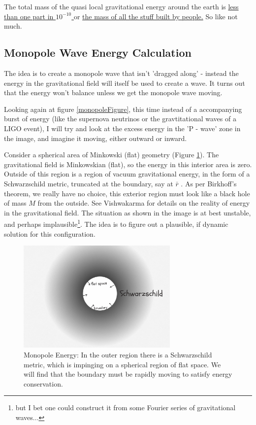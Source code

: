 \documentclass[../rzero]{subfiles}
\begin{document}
The total mass of the quasi local gravitational energy around the earth is  \href{https://www.wolframalpha.com/input?i=%28G*%28mass+of+earth%29%5E2%2F%28c%5E2%2812000km%29%29%29%2F%28mass+of+earth%29}{less than one part in $10^{-10}$ } or \href{https://www.wolframalpha.com/input?i=G*%28mass+of+earth%29%5E2%2F%28c%5E2%2812000km%29%29}{the mass of all the stuff built by people.} So like not much.

\subsection{Monopole Wave Energy Calculation }
The idea is to create a monopole wave that isn't 'dragged along' - instead the energy in the gravitational field will itself be used to create a wave. It turns out that the energy won't balance unless we get the monopole wave moving.

Looking again at figure \ref{monopoleFigure}, this time instead of a accompanying burst of energy (like the supernova neutrinos or the gravtitational waves of a LIGO event), I will try and look at the excess energy in the 'P - wave' zone in the image, and imagine it moving, either outward or inward. 

Consider a spherical area of Minkowski (flat) geometry (Figure \ref{monopoleEnergy}). The gravitational field is Minkowskian (flat), so the energy in this interior area is zero. Outside of this region is a region of vacuum gravitational energy, in the form of a Schwarzschild metric, truncated at the boundary, say at $\bar r$ . As per Birkhoff's theorem, we really have no choice, this exterior region must look like a black hole of mass $M$ from the outside. See Vishwakarma\cite{vishwakarmaMysteriesRikNovel2014}\cite{vishwakarmaEinsteinCriticalPerspective2016} for details on the reality of energy in the gravitational field. The situation as shown in the image is at best unstable, and perhaps implausible\footnote{but I bet one could construct it from some Fourier series of gravitational waves...}. The idea is to figure out a plausible, if dynamic solution for this configuration. 


\begin{figure}
\includegraphics[width=0.7\textwidth]{chapters/images/monopole-energy.jpg}
\caption{Monopole Energy: In the outer region there is a Schwarzschild metric, which is impinging on a spherical region of flat space. We will find that the boundary must be rapidly moving to satisfy energy conservation.}
\label{monopoleEnergy}
\end{figure}
\end{document}
